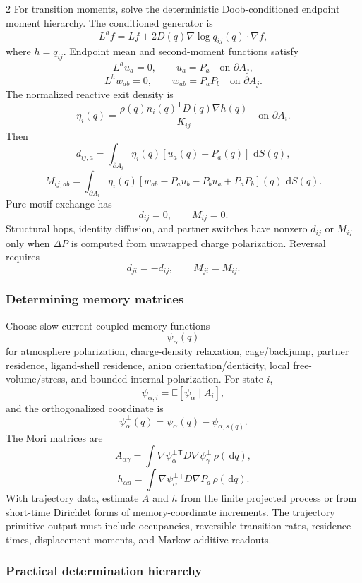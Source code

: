 \documentclass[10pt]{article}
\newcommand{\dd}{\,\mathrm d}
\newcommand{\T}{\mathsf{T}}
\begin{document}
\begin{multicols}{2}
For transition moments, solve the deterministic Doob-conditioned endpoint
moment hierarchy. The conditioned generator is
\[
L^h f
=
Lf+2D(q)\nabla\log q_{ij}(q)\cdot\nabla f,
\]
where \(h=q_{ij}\). Endpoint mean and second-moment functions satisfy
\[
L^hu_a=0,
\qquad
u_a=P_a\quad\text{on }\partial A_j,
\]
\[
L^hw_{ab}=0,
\qquad
w_{ab}=P_aP_b\quad\text{on }\partial A_j.
\]
The normalized reactive exit density is
\[
\eta_i(q)=
\frac{\rho(q)n_i(q)^\T D(q)\nabla h(q)}{K_{ij}}
\quad\text{on }\partial A_i.
\]
Then
\[
d_{ij,a}=
\int_{\partial A_i}\eta_i(q)[u_a(q)-P_a(q)]\,\dd S(q),
\]
\[
M_{ij,ab}=
\int_{\partial A_i}\eta_i(q)
[w_{ab}-P_au_b-P_bu_a+P_aP_b](q)\,\dd S(q).
\]
Pure motif exchange has
\[
d_{ij}=0,\qquad M_{ij}=0.
\]
Structural hops, identity diffusion, and partner switches have nonzero
\(d_{ij}\) or \(M_{ij}\) only when \(\Delta P\) is computed from unwrapped
charge polarization. Reversal requires
\[
d_{ji}=-d_{ij},
\qquad
M_{ji}=M_{ij}.
\]

\subsubsection{Determining memory matrices}

Choose slow current-coupled memory functions
\[
\psi_\alpha(q)
\]
for atmosphere polarization, charge-density relaxation, cage/backjump,
partner residence, ligand-shell residence, anion orientation/denticity, local
free-volume/stress, and bounded internal polarization. For state \(i\),
\[
\bar\psi_{\alpha,i}=\mathbb E[\psi_\alpha\mid A_i],
\]
and the orthogonalized coordinate is
\[
\psi_\alpha^\perp(q)
=
\psi_\alpha(q)-\bar\psi_{\alpha,s(q)}.
\]
The Mori matrices are
\[
A_{\alpha\gamma}
=
\int
\nabla\psi_\alpha^\perp{}^\T
D
\nabla\psi_\gamma^\perp
\,\rho(\dd q),
\]
\[
h_{\alpha a}
=
\int
\nabla\psi_\alpha^\perp{}^\T
D
\nabla P_a
\,\rho(\dd q).
\]
With trajectory data, estimate \(A\) and \(h\) from the finite projected process
or from short-time Dirichlet forms of memory-coordinate increments. The
trajectory primitive output must include occupancies, reversible transition
rates, residence times, displacement moments, and Markov-additive readouts.

\subsubsection{Practical determination hierarchy}


\end{multicols}
\end{document}
